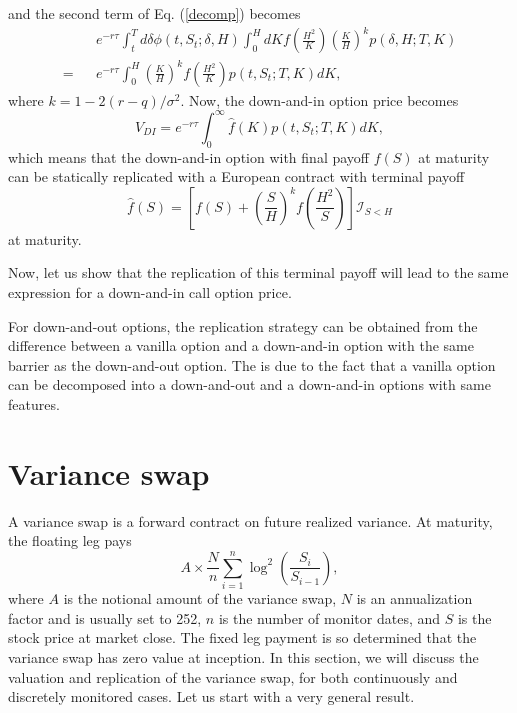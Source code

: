 \documentclass[12pt]{article}
\begin{document}
  and the second term of Eq. (\ref{decomp}) becomes
  \begin{eqnarray}
      &&e^{-r\tau}\int_t^Td\delta \phi(t,S_t;\delta,H)\int_0^HdK f\left(\frac{H^2}{K}\right)\left(\frac{K}{H}\right)^kp\left(\delta,H;T,K\right)\nonumber\\
    = &&e^{-r\tau}\int_0^H \left(\frac{K}{H}\right)^kf\left(\frac{H^2}{K}\right)p\left(t, S_t;T,K\right)dK,
  \end{eqnarray}
  where $k=1-2(r-q)/\sigma^2$. Now, the down-and-in option price becomes
  \begin{equation}
    V_{DI} = e^{-r\tau}\int_0^{\infty} \hat{f}(K)p\left(t, S_t;T,K\right)dK,
  \end{equation}
  which means that the down-and-in option with final payoff $f(S)$ at maturity can be statically replicated with
  a European contract with terminal payoff \cite{CarrChou}
  \begin{equation}
    \hat{f}(S) = \left[f(S) + \left(\frac{S}{H}\right)^kf\left(\frac{H^2}{S}\right)\right]\mathcal{I}_{S<H}
  \end{equation}
  at maturity.

  Now, let us show that the replication of this terminal payoff will lead to the same expression for a down-and-in call option price.

  For down-and-out options, the replication strategy can be obtained from the difference between a
  vanilla option and a down-and-in option with the same barrier
  as the down-and-out option. The is due to the fact that a vanilla option can be decomposed into a
  down-and-out and a down-and-in options with same features.

\section{Variance swap}

  A variance swap is a forward contract on future realized variance. At maturity, the floating leg pays
  \begin{equation}
    A\times\frac{N}{n}\sum_{i=1}^{n}\log^2\left(\frac{S_i}{S_{i-1}}\right),
    \label{VarSwapPayoff}
  \end{equation}
  where $A$ is the notional amount of the variance swap, $N$ is an annualization factor and is usually set to
  252, $n$ is the number of monitor dates, and $S$ is the stock price at market close. The fixed leg payment is
  so determined that the variance swap has zero value at inception. In this section, we will discuss the valuation
  and replication of the variance swap, for both continuously and discretely monitored cases. Let us start with
  a very general result.
\end{document}
